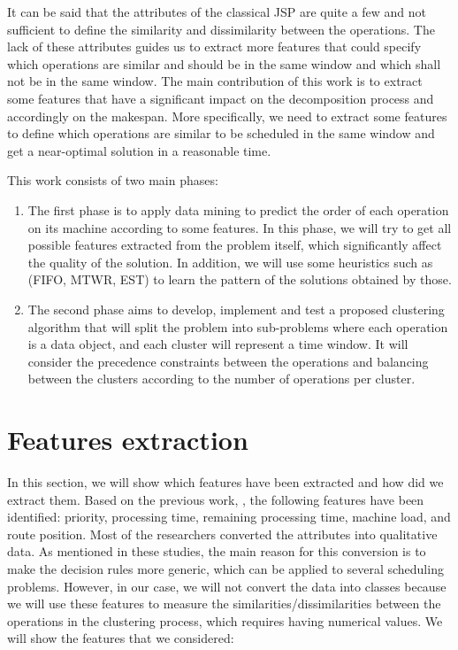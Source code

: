 \documentclass{article}
\begin{document}
It can be said that the attributes of the classical JSP are quite a few and not sufficient to define the similarity and dissimilarity between the operations. The lack of these attributes guides us to extract more features that could specify which operations are similar and should be in the same window and which shall not be in the same window. The main contribution of this work is to extract some features that have a significant impact on the decomposition process and accordingly on the makespan. 
More specifically, we need to extract some features to define which operations are similar to be scheduled in the same window and get a near-optimal solution in a reasonable time. 

This work consists of two main phases:

\begin{enumerate}
    \item The first phase is to apply data mining to predict the order of each operation on its machine according to some features. In this phase, we will try to get all possible features extracted from the problem itself, which significantly affect the quality of the solution. In addition, we will use some heuristics such as (FIFO, MTWR, EST) to learn the pattern of the solutions obtained by those.

    \item The second phase aims to develop, implement and test a proposed clustering algorithm that will split the problem into sub-problems where each operation is a data object, and each cluster will represent a time window. It will consider the precedence constraints between the operations and balancing between the clusters according to the number of operations per cluster.
\end{enumerate}


\section{Features extraction}
In this section, we will show which features have been extracted and how did we extract them. Based on the previous work, \cite{koonce2000using, harrath2002genetic, shahzad2010discovering, ismail2012production, adibi2014clustering, nasiri2019data}, the following features have been identified: priority, processing time, remaining processing time, machine load, and route position. Most of the researchers converted the attributes into qualitative data. As mentioned in these studies, the main reason for this conversion is to make the decision rules more generic, which can be applied to several scheduling problems. However, in our case, we will not convert the data into classes because we will use these features to measure the similarities/dissimilarities between the operations in the clustering process, which requires having numerical values.
We will show the features that we considered:
\end{document}
